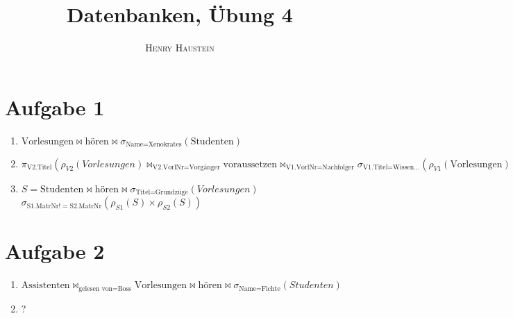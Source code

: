 \documentclass{article}
\title{\textbf{Datenbanken, Übung 4}}
\author{\textsc{Henry Haustein}}
\date{}
\begin{document}
	\maketitle
	
	\section*{Aufgabe 1}
	\begin{enumerate}[label=(\alph*)]
		\item $\text{Vorlesungen}\bowtie\text{hören}\bowtie\sigma_{\text{Name} = \text{Xenokrates}}(\text{Studenten})$
		\item $\pi_{\text{V2.Titel}}(\rho_{V2}(Vorlesungen)\bowtie_{\text{V2.VorlNr} = \text{Vorgänger}}\text{voraussetzen}\bowtie_{\text{V1.VorlNr} = \text{Nachfolger}}\sigma_{\text{V1.Titel} = \text{Wissen...}}(\rho_{V1}(\text{Vorlesungen})))$
		\item $S = \text{Studenten}\bowtie\text{hören}\bowtie\sigma_{\text{Titel} = \text{Grundzüge}}(Vorlesungen)$ \\
		$\sigma_{\text{S1.MatrNr} != \text{S2.MatrNr}}(\rho_{S1}(S)\times \rho_{S2}(S))$
	\end{enumerate}

	\section*{Aufgabe 2}
	\begin{enumerate}[label=(\alph*)]
		\item $\text{Assistenten}\bowtie_{\text{gelesen von} = \text{Boss}}\text{Vorlesungen}\bowtie\text{hören}\bowtie\sigma_{\text{Name} = \text{Fichte}}(Studenten)$
		\item ?
	\end{enumerate}
\end{document}

